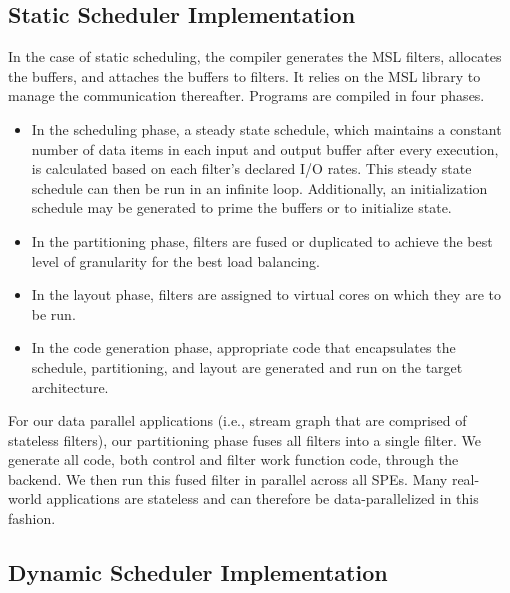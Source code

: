 \subsection{Static Scheduler Implementation}
In the case of static scheduling, the compiler generates the MSL
filters, allocates the buffers, and attaches the buffers to
filters. It relies on the MSL library to manage the communication
thereafter. Programs are compiled in four phases.
\begin{itemize}
\item In the scheduling phase, a steady state schedule, which
maintains a constant number of data items in each input and output
buffer after every execution, is calculated based on each filter's
declared I/O rates. This steady state schedule can then be run in an
infinite loop. Additionally, an initialization schedule may be
generated to prime the buffers or to initialize state.
\item In the partitioning phase, filters are fused or duplicated to achieve
the best level of granularity for the best load balancing.
\item In the layout phase, filters are assigned to virtual cores on
which they are to be run.
\item In the code generation phase, appropriate code that encapsulates
the schedule, partitioning, and layout are generated and run on the
target architecture.
\end{itemize}

For our data parallel applications (i.e., stream graph that are
comprised of stateless filters), our partitioning phase fuses all
filters into a single filter. We generate all code, both control and
filter work function code, through the backend. We then run this fused
filter in parallel across all SPEs. Many real-world applications are
stateless and can therefore be data-parallelized in this fashion.



\subsection{Dynamic Scheduler Implementation}\label{ch:ds:imp}

